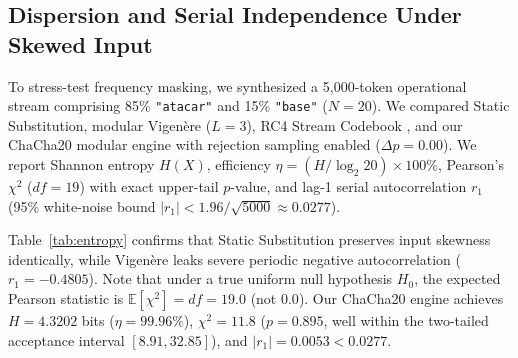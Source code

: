 \documentclass[conference]{IEEEtran}
\begin{document}
\subsection{Dispersion and Serial Independence Under Skewed Input}
To stress-test frequency masking, we synthesized a 5,000-token operational stream comprising 85\% \texttt{"atacar"} and 15\% \texttt{"base"} ($N=20$). We compared Static Substitution, modular Vigen\`ere ($L=3$), RC4 Stream Codebook \cite{madarrocap2021measuring}, and our ChaCha20 modular engine with rejection sampling enabled ($\Delta p = 0.00$). We report Shannon entropy $H(X)$, efficiency $\eta = (H / \log_2 20) \times 100\%$, Pearson's $\chi^2$ ($df = 19$) with exact upper-tail $p$-value, and lag-1 serial autocorrelation $r_1$ (95\% white-noise bound $|r_1| < 1.96/\sqrt{5000} \approx 0.0277$).

\begin{table}[htbp]
\caption{Dispersion and Serial Independence on 85\%-Skewed Input ($m=5{,}000, N=20$)}
\label{tab:entropy}
\centering
{}
\end{table}

Table~\ref{tab:entropy} confirms that Static Substitution preserves input skewness identically, while Vigen\`ere leaks severe periodic negative autocorrelation ($r_1 = -0.4805$). Note that under a true uniform null hypothesis $H_0$, the expected Pearson statistic is $\mathbb{E}[\chi^2] = df = 19.0$ (not $0.0$). Our ChaCha20 engine achieves $H = 4.3202$ bits ($\eta = 99.96\%$), $\chi^2 = 11.8$ ($p = 0.895$, well within the two-tailed acceptance interval $[8.91, 32.85]$), and $|r_1| = 0.0053 < 0.0277$.
\end{document}
